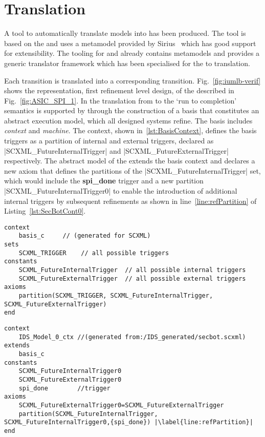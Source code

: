 
\section{\SCXML Translation}
\label{sec:translation}

A tool to automatically translate \SCXML models into \iUMLB has been produced. 
The tool is based on the \EMF and uses a \SCXML metamodel provided by Sirius~\cite{siriuswebsite} which has good support for extensibility. 
The tooling for \iUMLB and \EventB already contains \EMF metamodels and provides a generic translator framework which has been specialised for the \SCXML to \iUMLB translation. 

Each \SCXML transition is translated into a corresponding \iUMLB transition. 
Fig.~\ref{fig:iumlb-verif} shows the \iUMLB representation, first refinement level design, of the \IDS described in
Fig.~\ref{fig:ASIC_SPI_1}. 
In the translation from \iUMLB to \EventB the `run to completion' semantics is supported by \EventB through the construction of a basis that constitutes an abstract execution model, which all designed systems refine. 
The basis includes \EventB \emph{context} and \emph{machine}. 
The context, shown in~\ref{lst:BasisContext}, defines the basis triggers as a partition of internal and external triggers, declared as |SCXML_FutureInternalTrigger| and |SCXML_FutureExternalTrigger| respectively. 
The abstract model of the \IDS extends the basis context and declares a new axiom that defines the partitions of the |SCXML_FutureInternalTrigger| set, which would include the \textbf{spi\_done} trigger and a new partition |SCXML_FutureInternalTrigger0| to enable the introduction of additional internal triggers by subsequent refinements as shown in line~\ref{line:refPartition} of Listing~\ref{lst:SecBotCont0}. 

\begin{lstlisting}[caption={Abstract basis context},label={lst:BasisContext}, language=Event-B, escapechar=|, frame=single]
context
	basis_c 	// (generated for SCXML)
sets
	SCXML_TRIGGER	 // all possible triggers
constants
	SCXML_FutureInternalTrigger	 // all possible internal triggers
	SCXML_FutureExternalTrigger	 // all possible external triggers  
axioms
	partition(SCXML_TRIGGER, SCXML_FutureInternalTrigger, SCXML_FutureExternalTrigger) 
end
\end{lstlisting}	

\begin{lstlisting}[caption={Context for \IDS abstract model},label={lst:SecBotCont0}, language=Event-B, escapechar=|, frame=single]
context
	IDS_Model_0_ctx //(generated from:/IDS_generated/secbot.scxml)
extends
	basis_c 
constants
	SCXML_FutureInternalTrigger0	
	SCXML_FutureExternalTrigger0
	spi_done	 	//trigger
axioms
	SCXML_FutureExternalTrigger0=SCXML_FutureExternalTrigger
	partition(SCXML_FutureInternalTrigger, SCXML_FutureInternalTrigger0,{spi_done}) |\label{line:refPartition}|
end
\end{lstlisting}


